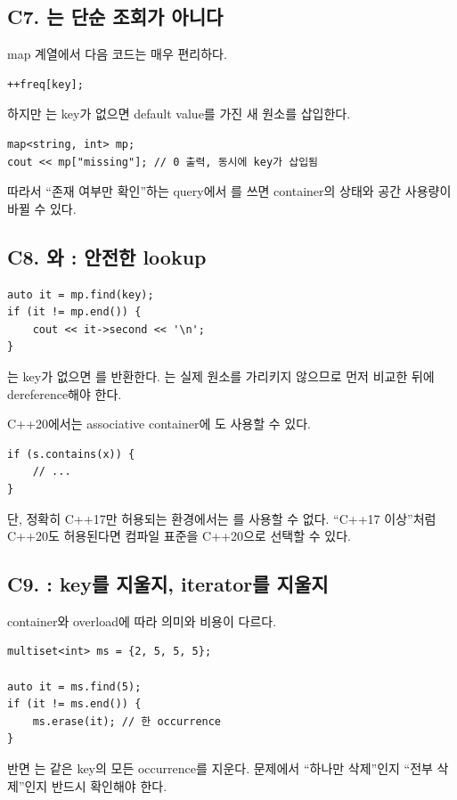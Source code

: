 \subsection{C7. 는 단순 조회가 아니다}
map 계열에서 다음 코드는 매우 편리하다.
\begin{lstlisting}
++freq[key];
\end{lstlisting}

하지만 는 key가 없으면 default value를 가진 새 원소를 삽입한다.
\begin{lstlisting}
map<string, int> mp;
cout << mp["missing"]; // 0 출력, 동시에 key가 삽입됨
\end{lstlisting}

따라서 ``존재 여부만 확인''하는 query에서 를 쓰면 container의 상태와 공간 사용량이 바뀔 수 있다.

\subsection{C8. 와 : 안전한 lookup}
\begin{lstlisting}
auto it = mp.find(key);
if (it != mp.end()) {
    cout << it->second << '\n';
}
\end{lstlisting}

는 key가 없으면 를 반환한다. 는 실제 원소를 가리키지 않으므로 먼저 비교한 뒤에 dereference해야 한다.

C++20에서는 associative container에 도 사용할 수 있다.
\begin{lstlisting}
if (s.contains(x)) {
    // ...
}
\end{lstlisting}

단, 정확히 C++17만 허용되는 환경에서는 를 사용할 수 없다. ``C++17 이상''처럼 C++20도 허용된다면 컴파일 표준을 C++20으로 선택할 수 있다.

\subsection{C9. : key를 지울지, iterator를 지울지}
container와 overload에 따라 의미와 비용이 다르다.
\begin{lstlisting}
multiset<int> ms = {2, 5, 5, 5};

auto it = ms.find(5);
if (it != ms.end()) {
    ms.erase(it); // 한 occurrence
}
\end{lstlisting}

반면 는 같은 key의 모든 occurrence를 지운다. 문제에서 ``하나만 삭제''인지 ``전부 삭제''인지 반드시 확인해야 한다.


